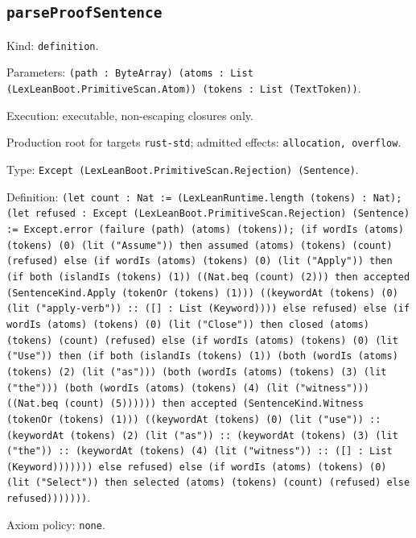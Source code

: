 \documentclass[11pt]{article}
\begin{document}
\subsection*{\texttt{parseProofSentence}}
\noindent Kind: \texttt{definition}.\par
\noindent Parameters: \texttt{(path : ByteArray) (atoms : List (LexLeanBoot.PrimitiveScan.Atom)) (tokens : List (TextToken))}.\par
\noindent Execution: executable, non-escaping closures only.\par
\noindent Production root for targets \texttt{rust-std}; admitted effects: \texttt{allocation, overflow}.\par
\noindent Type: \texttt{Except (LexLeanBoot.PrimitiveScan.Rejection) (Sentence)}.\par
\noindent Definition: \texttt{(let count : Nat := (LexLeanRuntime.length (tokens) : Nat); (let refused : Except (LexLeanBoot.PrimitiveScan.Rejection) (Sentence) := Except.error (failure (path) (atoms) (tokens)); (if wordIs (atoms) (tokens) (0) (lit ("Assume")) then assumed (atoms) (tokens) (count) (refused) else (if wordIs (atoms) (tokens) (0) (lit ("Apply")) then (if both (islandIs (tokens) (1)) ((Nat.beq (count) (2))) then accepted (SentenceKind.Apply (tokenOr (tokens) (1))) ((keywordAt (tokens) (0) (lit ("apply-verb")) :: ([] : List (Keyword)))) else refused) else (if wordIs (atoms) (tokens) (0) (lit ("Close")) then closed (atoms) (tokens) (count) (refused) else (if wordIs (atoms) (tokens) (0) (lit ("Use")) then (if both (islandIs (tokens) (1)) (both (wordIs (atoms) (tokens) (2) (lit ("as"))) (both (wordIs (atoms) (tokens) (3) (lit ("the"))) (both (wordIs (atoms) (tokens) (4) (lit ("witness"))) ((Nat.beq (count) (5)))))) then accepted (SentenceKind.Witness (tokenOr (tokens) (1))) ((keywordAt (tokens) (0) (lit ("use")) :: (keywordAt (tokens) (2) (lit ("as")) :: (keywordAt (tokens) (3) (lit ("the")) :: (keywordAt (tokens) (4) (lit ("witness")) :: ([] : List (Keyword))))))) else refused) else (if wordIs (atoms) (tokens) (0) (lit ("Select")) then selected (atoms) (tokens) (count) (refused) else refused)))))))}.\par
\noindent Axiom policy: \texttt{none}.\par
\end{document}
